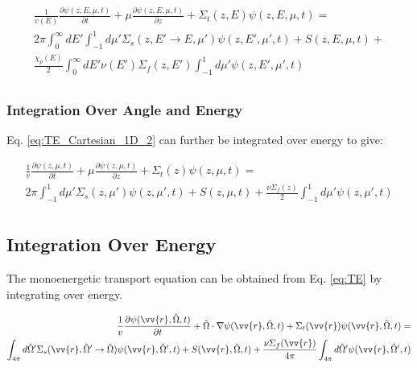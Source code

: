 \documentclass[10pt]{article}
\begin{document}
\begin{flushleft}
\begin{equation}
\label{eq:TE_Cartesian_1D_2}
\begin{aligned}
\frac{1}{v(E)} \frac{\partial\psi(z, E, \mu,t)}{\partial t} + \mu \frac{\partial \psi(z, E, \mu,t)}{\partial z} +
 \Sigma_t(z,E)\psi(z, E, \mu,t) =\\
 2\pi \int_{0}^{\infty}dE' \int_{-1}^{1} d\mu' \Sigma_s(z, E'\rightarrow E, \mu')\psi(z, E', \mu',t) + S(z, E, \mu, t)+\\
 \frac{\chi_p(E)}{2} \int_{0}^{\infty} dE'\nu(E')\Sigma_f(z, E')\int_{-1}^{1} d\mu'\psi(z, E', \mu',t)\\
\end{aligned}
\end{equation}

\subsubsection{Integration Over Angle and Energy}
Eq. \eqref{eq:TE_Cartesian_1D_2} can further be integrated over energy to give:

\begin{equation}
\label{eq:TE_Cartesian_1D_2_noenergy}
\begin{aligned}
\frac{1}{v} \frac{\partial\psi(z, \mu,t)}{\partial t} + \mu \frac{\partial \psi(z, \mu,t)}{\partial z} +
 \Sigma_t(z)\psi(z, \mu,t) =\\
 2\pi\int_{-1}^{1} d\mu' \Sigma_s(z, \mu')\psi(z,\mu',t) + S(z, \mu, t)+\frac{\nu\Sigma_f(z)}{2}\int_{-1}^{1} d\mu'\psi(z, \mu',t)\\
\end{aligned}
\end{equation}

\subsection{Integration Over Energy}

The monoenergetic transport equation can be obtained from Eq. \eqref{eq:TE} by integrating over energy. 

\begin{equation}
\label{eq:TEMonoenergetic}
\begin{aligned}
\frac{1}{v} \frac{\partial\psi(\vv{r},\hat{\Omega},t)}{\partial t} +
 \hat{\Omega}\cdot\nabla\psi(\vv{r}, \hat{\Omega},t) + 
 \Sigma_t(\vv{r})\psi(\vv{r}, \hat{\Omega},t) = \\
\int_{4\pi}^{ } d\hat{\Omega}' \Sigma_s(\vv{r}, \hat{\Omega}'\rightarrow\hat{\Omega})\psi(\vv{r}, \hat{\Omega}',t) + S(\vv{r}, \hat{\Omega},t)+\frac{\nu\Sigma_f(\vv{r})}{4\pi} \int_{4\pi}^{} d\hat{\Omega}'\psi(\vv{r},\hat{\Omega}',t)\\
\end{aligned}
\end{equation}


\end{flushleft}
\end{document}
